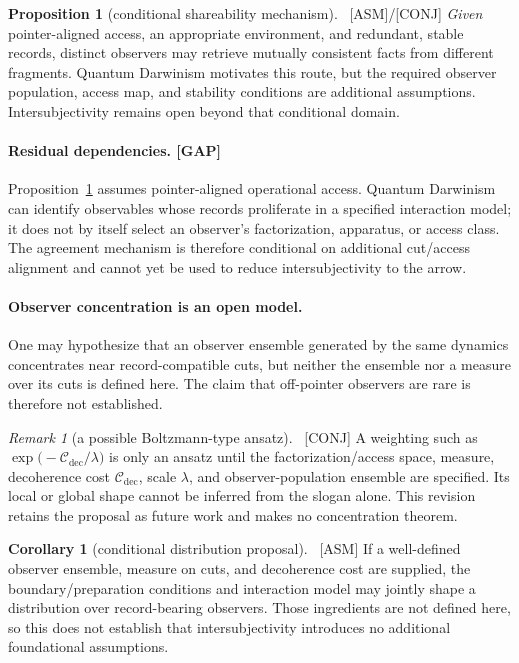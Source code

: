 \documentclass[11pt]{article}
\newcommand{\asm}{\textcolor{blue!70!black}{\textsf{\small[ASM]}}}
\newcommand{\conj}{\textcolor{orange!80!black}{\textsf{\small[CONJ]}}}
\newcommand{\post}{\textcolor{purple!70!black}{\textsf{\small[POST]}}}
\newcommand{\gap}{\textcolor{red!75!black}{\textsf{\small[GAP]}}}
\def\conj{[CONJ]}\def\post{[POST]}\def\gap{[GAP]}%
\theoremstyle{definition}
\newtheorem{proposition}{Proposition}[section]
\newtheorem{corollary}{Corollary}[section]
\theoremstyle{remark}
\newtheorem*{remark}{Remark}
\begin{document}
\begin{proposition}[conditional shareability mechanism]\label{prop:inter}{\normalfont\ \asm/\conj}
\emph{Given} pointer-aligned access, an appropriate environment, and redundant, stable records, distinct observers may retrieve mutually consistent facts from different fragments. Quantum Darwinism motivates this route, but the required observer population, access map, and stability conditions are additional assumptions. Intersubjectivity remains open beyond that conditional domain.
\end{proposition}

\paragraph{Residual dependencies. \gap}
Proposition~\ref{prop:inter} assumes pointer-aligned operational access. Quantum Darwinism can identify observables whose records proliferate in a specified interaction model; it does not by itself select an observer's factorization, apparatus, or access class. The agreement mechanism is therefore conditional on additional cut/access alignment and cannot yet be used to reduce intersubjectivity to the arrow.

\paragraph{Observer concentration is an open model.}
One may hypothesize that an observer ensemble generated by the same dynamics concentrates near record-compatible cuts, but neither the ensemble nor a measure over its cuts is defined here. The claim that off-pointer observers are rare is therefore not established.

\begin{remark}[a possible Boltzmann-type ansatz]{\normalfont\ \conj}
A weighting such as $\exp\!\big(-\mathcal{C}_{\text{dec}}/\lambda\big)$ is only an ansatz until the factorization/access space, measure, decoherence cost $\mathcal{C}_{\text{dec}}$, scale $\lambda$, and observer-population ensemble are specified. Its local or global shape cannot be inferred from the slogan alone. This revision retains the proposal as future work and makes no concentration theorem.
\end{remark}

\begin{corollary}[conditional distribution proposal\label{cor:dist}]{\normalfont\ \asm}
If a well-defined observer ensemble, measure on cuts, and decoherence cost are supplied, the boundary/preparation conditions and interaction model may jointly shape a distribution over record-bearing observers. Those ingredients are not defined here, so this does not establish that intersubjectivity introduces no additional foundational assumptions.
\end{corollary}
\end{document}
